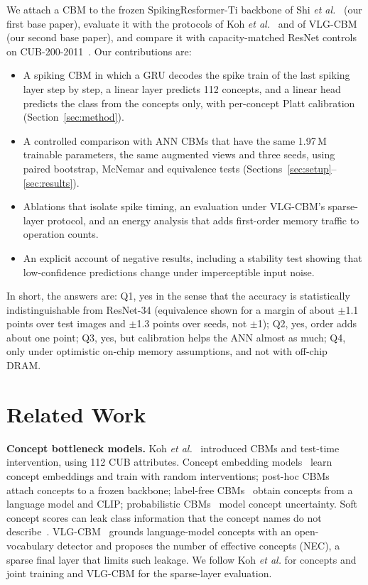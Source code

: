 \documentclass[conference]{IEEEtran}
\begin{document}
We attach a CBM to the frozen SpikingResformer-Ti backbone of Shi \emph{et al.}~\cite{shi2024spikingresformer} (our first base paper), evaluate it with the protocols of Koh \emph{et al.}~\cite{koh2020concept} and of VLG-CBM~\cite{srivastava2024vlgcbm} (our second base paper), and compare it with capacity-matched ResNet controls on CUB-200-2011~\cite{wah2011cub}. Our contributions are:
\begin{itemize}
\item A spiking CBM in which a GRU decodes the spike train of the last spiking layer step by step, a linear layer predicts 112 concepts, and a linear head predicts the class from the concepts only, with per-concept Platt calibration (Section~\ref{sec:method}).
\item A controlled comparison with ANN CBMs that have the same 1.97\,M trainable parameters, the same augmented views and three seeds, using paired bootstrap, McNemar and equivalence tests (Sections~\ref{sec:setup}--\ref{sec:results}).
\item Ablations that isolate spike timing, an evaluation under VLG-CBM's sparse-layer protocol, and an energy analysis that adds first-order memory traffic to operation counts.
\item An explicit account of negative results, including a stability test showing that low-confidence predictions change under imperceptible input noise.
\end{itemize}
In short, the answers are: Q1, yes in the sense that the accuracy is statistically indistinguishable from ResNet-34 (equivalence shown for a margin of about $\pm$1.1 points over test images and $\pm$1.3 points over seeds, not $\pm$1); Q2, yes, order adds about one point; Q3, yes, but calibration helps the ANN almost as much; Q4, only under optimistic on-chip memory assumptions, and not with off-chip DRAM.

\section{Related Work}

\textbf{Concept bottleneck models.} Koh \emph{et al.}~\cite{koh2020concept} introduced CBMs and test-time intervention, using 112 CUB attributes. Concept embedding models~\cite{espinosa2022concept} learn concept embeddings and train with random interventions; post-hoc CBMs~\cite{yuksekgonul2023posthoc} attach concepts to a frozen backbone; label-free CBMs~\cite{oikarinen2023labelfree} obtain concepts from a language model and CLIP; probabilistic CBMs~\cite{kim2023probabilistic} model concept uncertainty. Soft concept scores can leak class information that the concept names do not describe~\cite{margeloiu2021concept,mahinpei2021promises,havasi2022addressing}. VLG-CBM~\cite{srivastava2024vlgcbm} grounds language-model concepts with an open-vocabulary detector and proposes the number of effective concepts (NEC), a sparse final layer that limits such leakage. We follow Koh \emph{et al.} for concepts and joint training and VLG-CBM for the sparse-layer evaluation.
\end{document}
